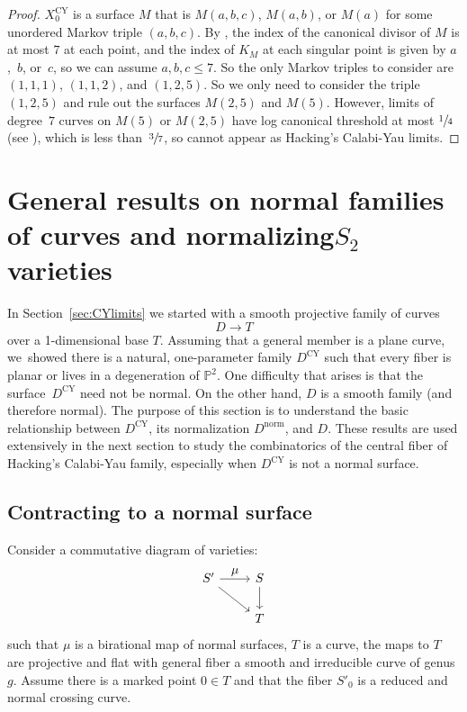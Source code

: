 \documentclass[JEP,XML,SOM,Unicode,NoFloatCountersInSection,published]{cedram}
\let\ts\textstyle
\theoremstyle{plain}
\theoremstyle{definition}
\newcommand\PP{{\mathbb{P}}}
\newcommand\Dcy{{D^{\mathrm{CY}}}}
\newcommand\Dnorm{{D^{\mathrm{norm}}}}
\newcommand\Xcyo{{X^{\mathrm{CY}}_0}}
\begin{document}
\begin{proof}
$\Xcyo$ is a surface $M$ that is $M(a,b,c)$, $M(a,b)$, or $M(a)$ for some unordered Markov triple $(a,b,c)$. By \cite[Th.\,4.5]{Hacking}, the index of the canonical divisor of $M$ is at most $7$ at each point, and the index of $K_M$ at each singular point is given by $a$,~$b$, or~$c$, so we can assume $a,b,c\le 7$. So the only Markov triples to consider are $(1,1,1)$, $(1,1,2)$, and $(1,2,5)$. So we only need to consider the triple $(1,2,5)$ and rule out the surfaces $M(2,5)$ and $M(5)$. However, limits of degree~$7$ curves on $M(5)$ or $M(2,5)$ have log canonical threshold at most $\sfrac{1}{4}$ (see \eg \cite[Prop.\,9.13]{ADL19}), which is less than~$\sfrac{3}{7}$, so cannot appear as Hacking's Calabi-Yau limits.
\end{proof}

\section{General results on normal families of curves and normalizing\nobreakspace \texorpdfstring{$S_2$}{S2}\nobreakspace varieties}\label{sec:Dcynorm}

In Section~\ref{sec:CYlimits} we started with a smooth projective family of curves
\[
D\to T
\]
over a 1-dimensional base $T$. Assuming that a general member is a plane curve, we~showed there is a natural, one-parameter family $\Dcy$ such that every fiber is planar or lives in a degeneration of $\PP^2$. One difficulty that arises is that the surface~$\Dcy$ need not be normal. On the other hand, $D$ is a smooth family (and therefore normal). The purpose of this section is to understand the basic relationship between $\Dcy$, its normalization $\Dnorm$, and $D$. These results are used extensively in the next section to study the combinatorics of the central fiber of Hacking's Calabi-Yau family, especially when $\Dcy$ is not a normal surface.

\subsection{Contracting to a normal surface}
Consider a commutative diagram of varieties:
\[
\begin{tikzcd}
S'\arrow[r,"\ts\mu"]\arrow[dr]&S\arrow[d]\\
&T
\end{tikzcd}
\]
such that $\mu$ is a birational map of normal surfaces, $T$ is a curve, the maps to $T$ are projective and flat with general fiber a smooth and irreducible curve of genus $g$. Assume there is a marked point $0\in T$ and that the fiber $S'_0$ is a reduced and normal crossing curve.
\end{document}
